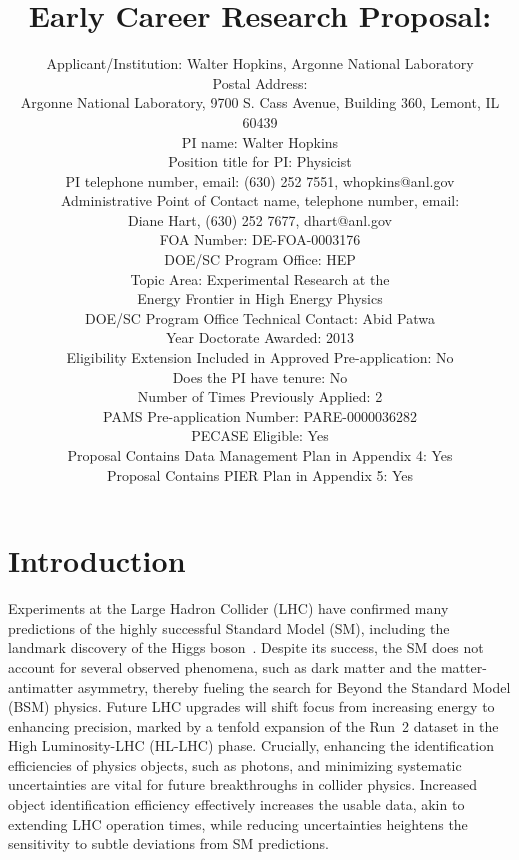 \documentclass[letter, USenglish, 11pt, subfigure]{article}
\title{Early Career Research Proposal: \\}
\author{Applicant/Institution: Walter Hopkins, Argonne National Laboratory\\ Postal Address: \\Argonne National Laboratory, 9700 S. Cass Avenue, Building 360, Lemont, IL 60439
  \\PI name: Walter Hopkins\\Position title for PI: Physicist\\PI telephone number, email: (630) 252 7551, whopkins@anl.gov\\Administrative Point of Contact name, telephone number, email:\\Diane Hart, (630) 252 7677, dhart@anl.gov\\FOA Number: DE-FOA-0003176\\DOE/SC Program Office: HEP\\ Topic Area: Experimental Research at the \\Energy Frontier in High Energy Physics\\DOE/SC Program Office Technical Contact: Abid Patwa\\Year Doctorate Awarded: 2013\\Eligibility Extension Included in Approved Pre-application: No\\Does the PI have tenure: No\\Number of Times Previously Applied: 2\\PAMS Pre-application Number: PARE-0000036282\\PECASE Eligible: Yes\\Proposal Contains Data Management Plan in Appendix 4: Yes\\Proposal Contains PIER Plan in Appendix 5: Yes
}
\date{}
\begin{document}

% 

\maketitle
\clearpage
\tableofcontents
\thispagestyle{empty}

\clearpage
{} 
\section{Introduction}

Experiments at the Large Hadron Collider (LHC) have confirmed many predictions of the highly successful Standard Model (SM), including the landmark discovery of the Higgs boson~\cite{HIGG-2012-27,CMS-HIG-12-028}. Despite its success, the SM does not account for several observed phenomena, such as dark matter and the matter-antimatter asymmetry, thereby fueling the search for Beyond the Standard Model (BSM) physics. Future LHC upgrades will shift focus from increasing energy to enhancing precision, marked by a tenfold expansion of the Run~2 dataset in the High Luminosity-LHC (HL-LHC) phase. Crucially, enhancing the identification efficiencies of physics objects, such as photons, and minimizing systematic uncertainties are vital for future breakthroughs in collider physics. Increased object identification efficiency effectively increases the usable data, akin to extending LHC operation times, while reducing uncertainties heightens the sensitivity to subtle deviations from SM predictions.
\end{document}
